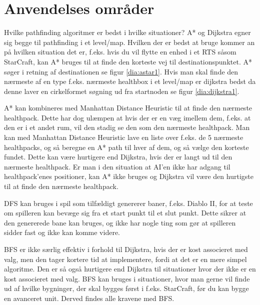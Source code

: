 \section{Anvendelses områder}

Hvilke pathfinding algoritmer er bedst i hvilke situationer?
A* og Dijkstra egner sig begge til pathfinding i et level/map. Hvilken der er bedst at bruge kommer an på hvilken situation det er, f.eks. hvis du vil flytte en enhed i et RTS såsom StarCraft, kan A* bruges til at finde den korteste vej til destinationspunktet. A* søger i retning af destinationen se figur \ref{dia:astar1}. Hvis man skal finde den nærmeste af en type f.eks. nærmeste healthbox i et level/map er dijkstra bedst da denne laver en cirkelformet søgning ud fra startnoden se figur \ref{dia:dijkstra1}. 

A* kan kombineres med Manhattan Distance Heuristic til at finde den nærmeste healthpack. Dette har dog ulæmpen at hvis der er en væg imellem dem, f.eks. at den er i et andet rum, vil den stadig se den som den nærmeste healthpack. Man kan med Manhattan Distance Heuristic lave en liste over f.eks. de 5 nærmeste healthpacks, og så beregne en A* path til hver af dem, og så vælge den korteste fundet. Dette kan være hurtigere end Dijkstra, hvis der er langt ud til den nærmeste healthpack. Er man i den situation at AI'en ikke har adgang til healthpack'enes positioner, kan A* ikke bruges og Dijkstra vil være den hurtigste til at finde den nærmeste healthpack.

DFS kan bruges i spil som tilfældigt genererer baner, f.eks. Diablo II, for at teste om spilleren kan bevæge sig fra et start punkt til et slut punkt. Dette sikrer at den genererede bane kan bruges, og ikke har nogle ting som gør at spilleren sidder fast og ikke kan komme videre.

BFS er ikke særlig effektiv i forhold til Dijkstra, hvis der er kost associeret med valg, men den tager kortere tid at implementere, fordi at det er en mere simpel algoritme. Den er så også hurtigere end Dijkstra til situationer hvor der ikke er en kost associeret med valg.
BFS kan bruges i situationer, hvor man gerne vil finde ud af hvilke bygninger, der skal bygges først i f.eks. StarCraft, før du kan bygge en avanceret unit. Derved findes alle kravene med BFS.